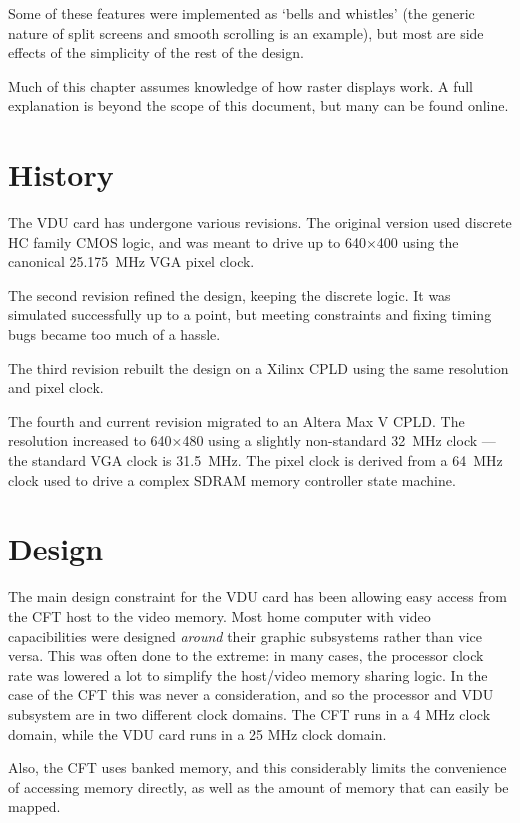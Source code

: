 Some of these features were implemented as ‘bells and whistles’ (the generic
nature of split screens and smooth scrolling is an example), but most are side
effects of the simplicity of the rest of the design.

Much of this chapter assumes knowledge of how raster displays work. A full
explanation is beyond the scope of this document, but many can be found online.



\section{History}

The VDU card has undergone various revisions. The original version
used discrete HC family CMOS logic, and was meant to drive up to
640×400 using the canonical 25.175~MHz VGA pixel clock.

The second revision refined the design, keeping the discrete logic. It
was simulated successfully up to a point, but meeting constraints and
fixing timing bugs became too much of a hassle.

The third revision rebuilt the design on a Xilinx CPLD using the same
resolution and pixel clock.

The fourth and current revision migrated to an Altera Max V CPLD. The
resolution increased to 640×480 using a slightly non-standard 32~MHz
clock — the standard VGA clock is 31.5~MHz. The pixel clock is derived
from a 64~MHz clock used to drive a complex SDRAM memory controller
state machine.

\section{Design}

The main design constraint for the VDU card has been allowing easy access from
the CFT host to the video memory. Most home computer with video capacibilities
were designed {\em around\/} their graphic subsystems rather than vice
versa. This was often done to the extreme: in many cases, the processor clock
rate was lowered a lot to simplify the host/video memory sharing logic. In the
case of the CFT this was never a consideration, and so the processor and VDU
subsystem are in two different clock domains. The CFT runs in a 4 MHz clock
domain, while the VDU card runs in a 25 MHz clock domain.

Also, the CFT uses banked memory, and this considerably limits the convenience
of accessing memory directly, as well as the amount of memory that can easily
be mapped.


